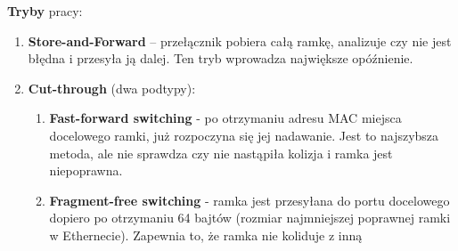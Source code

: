 \documentclass[main.tex]{subfiles}
\begin{document}
    \noindent \textbf{Tryby} pracy:
    \begin{enumerate}[noitemsep]
        \item \textbf{Store-and-Forward} – przełącznik pobiera całą ramkę, analizuje czy nie jest błędna i przesyła ją dalej. Ten tryb wprowadza największe opóźnienie.
        \item \textbf{Cut-through} (dwa podtypy):
        \begin{enumerate}[noitemsep]
            \item \textbf{Fast-forward switching} - po otrzymaniu adresu MAC miejsca docelowego ramki, już rozpoczyna się jej nadawanie.
            Jest to najszybsza metoda, ale nie sprawdza czy nie nastąpiła kolizja i ramka jest niepoprawna.
            \item \textbf{Fragment-free switching} - ramka jest przesyłana do portu docelowego dopiero po otrzymaniu 64 bajtów (rozmiar najmniejszej poprawnej ramki w Ethernecie).
            Zapewnia to, że ramka nie koliduje z inną
        \end{enumerate}
    \end{enumerate}
    \hfill \\
\end{document}

